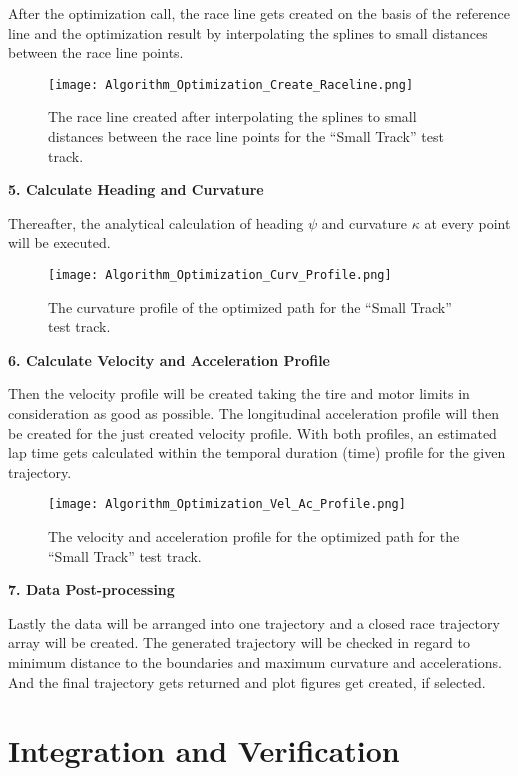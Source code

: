 After the optimization call, the race line gets created on the basis of the reference line and the optimization result by interpolating the splines to small distances between the race line points.
\begin{figure}[H]
    \centering
    \texttt{[image: Algorithm\_Optimization\_Create\_Raceline.png]}
    \caption{The race line created after interpolating the splines to small distances between the race line points for the ``Small Track'' test track.}
    \label{fig:Optimization Algorithm Created Race Line}
\end{figure}

\textbf{5. Calculate Heading and Curvature}

Thereafter, the analytical calculation of heading $\psi$ and curvature $\kappa$ at every point will be executed.
\begin{figure}[H]
    \centering
    \texttt{[image: Algorithm\_Optimization\_Curv\_Profile.png]}
    \caption{The curvature profile of the optimized path for the ``Small Track'' test track.}
    \label{fig:Optimization Algorithm Curvature Profile}
\end{figure}

\textbf{6. Calculate Velocity and Acceleration Profile}

Then the velocity profile will be created taking the tire and motor limits in consideration as good as possible. The longitudinal acceleration profile will then be created for the just created velocity profile. With both profiles, an estimated lap time gets calculated within the temporal duration (time) profile for the given trajectory.
\begin{figure}[H]
    \centering
    \texttt{[image: Algorithm\_Optimization\_Vel\_Ac\_Profile.png]}
    \caption{The velocity and acceleration profile for the optimized path for the ``Small Track'' test track.}
    \label{fig:Optimization Algorithm Velocity and Acceleration Profile}
\end{figure}

\textbf{7. Data Post-processing}

Lastly the data will be arranged into one trajectory and a closed race trajectory array will be created. The generated trajectory will be checked in regard to minimum distance to the boundaries and maximum curvature and accelerations. And the final trajectory gets returned and plot figures get created, if selected.

\section{Integration and Verification} \label{sec:Integration and Verification}

